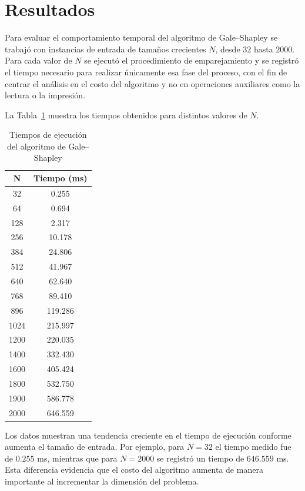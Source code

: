 \section{Resultados}

Para evaluar el comportamiento temporal del algoritmo de Gale--Shapley se trabajó con instancias de entrada de tamaños crecientes $N$, desde $32$ hasta $2000$. Para cada valor de $N$ se ejecutó el procedimiento de emparejamiento y se registró el tiempo necesario para realizar únicamente esa fase del proceso, con el fin de centrar el análisis en el costo del algoritmo y no en operaciones auxiliares como la lectura o la impresión.

La Tabla~\ref{tabla:tiempos} muestra los tiempos obtenidos para distintos valores de $N$.

\begin{table}[h]
\centering
\caption{Tiempos de ejecución del algoritmo de Gale--Shapley}
\label{tabla:tiempos}
\begin{tabular}{|c|c|}
\hline
\textbf{N} & \textbf{Tiempo (ms)} \\
\hline
32   & 0.255 \\
64   & 0.694 \\
128  & 2.317 \\
256  & 10.178 \\
384  & 24.806 \\
512  & 41.967 \\
640  & 62.640 \\
768  & 89.410 \\
896  & 119.286 \\
1024 & 215.997 \\
1200 & 220.035 \\
1400 & 332.430 \\
1600 & 405.424 \\
1800 & 532.750 \\
1900 & 586.778 \\
2000 & 646.559 \\
\hline
\end{tabular}
\end{table}

Los datos muestran una tendencia creciente en el tiempo de ejecución conforme aumenta el tamaño de entrada. Por ejemplo, para $N=32$ el tiempo medido fue de $0.255$ ms, mientras que para $N=2000$ se registró un tiempo de $646.559$ ms. Esta diferencia evidencia que el costo del algoritmo aumenta de manera importante al incrementar la dimensión del problema.

